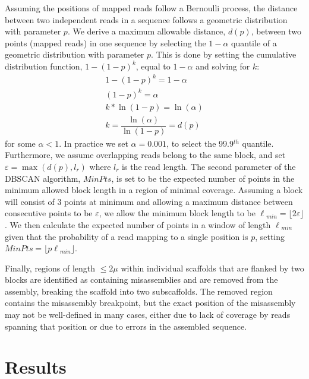 \documentclass{bioinfo}
\begin{document}
Assuming the positions of mapped reads  
follow a Bernoulli process, the distance between two independent reads in a sequence follows a geometric distribution with parameter $p$.
We derive a maximum allowable distance, $d(p)$, between two points (mapped reads) in one sequence by selecting the
$1-\alpha$ quantile of a geometric distribution with parameter $p$. This is done by setting the cumulative distribution function, $1 - (1-p)^k$, equal to $1-\alpha$ and solving for $k$:
\begin{eqnarray}
	1 - (1-p)^{k} = 1-\alpha \nonumber \\
	(1-p)^{k} = \alpha  \nonumber \\ 
	k*\ln(1-p) = \ln(\alpha)  \nonumber \\
	k = \dfrac{\ln(\alpha)}{\ln(1-p)} = d(p)
\end{eqnarray} 
for some $\alpha < 1$. In practice we set $\alpha = 0.001$, to select the 99.9$^{th}$ quantile. Furthermore, we assume overlapping reads belong to
the same block, and set $\varepsilon = \max(d(p),l_r)$ where $l_r$ is the read length.
The second parameter of the DBSCAN algorithm, $MinPts$, is set to be the expected number of points in the minimum allowed block length in a region
of minimal coverage. Assuming a block will consist of
3 points at minimum and allowing a maximum distance between consecutive points to be $\varepsilon$, we allow the minimum block length to be 
$\ell{_{min}} = \lfloor2\varepsilon\rfloor$. We then calculate the expected number of points in a window of length $\ell{_{min}}$ given that the probability of
a read mapping to a single position is $p$, setting $MinPts = \lfloor{p\ell{_{min}}}\rfloor$. 

Finally, regions of length $\le 2\mu$ within individual scaffolds that are flanked by two blocks are identified as containing
misassemblies and are removed from the assembly, breaking the scaffold into two subscaffolds. The removed region contains the 
misassembly breakpoint, but the exact position of the misassembly may not be well-defined in many cases, either due to lack of
coverage by reads spanning that position or due to errors in the assembled sequence.



\section{Results}
\end{document}
